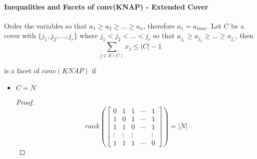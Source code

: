             \paragraph{Inequalities and Facets of conv(KNAP) - Extended Cover}
                Order the variables so that $a_1 \ge a_2 \ge \dots \ge a_n$, therefore $a_1 = a_{max}$. Let $C$ be a cover with $\{j_1, j_2, \dots, j_r\}$ where $j_1 < j_2 < \dots < j_r$ so that $a_{j_1} \ge a_{j_2} \ge \dots \ge a_{j_r}$, then
                \begin{equation*}
                    \sum_{j\in E(C)} x_j \le |C| - 1 
                \end{equation*}

                is a facet of $conv(KNAP)$ if
                \begin{itemize}               
                    \item $C = N$
                        \begin{proof}
                            \begin{equation*}
                                rank(\begin{bmatrix}
                                    0 & 1 & 1 & \cdots & 1 \\
                                    1 & 0 & 1 & \cdots & 1 \\
                                    1 & 1 & 0 & \cdots & 1 \\
                                    \vdots & \vdots & \vdots & & \vdots\\
                                    1 & 1 & 1 & \cdots & 0
                                    \end{bmatrix}) = |N|
                            \end{equation*}
                        \end{proof}


\end{itemize}
